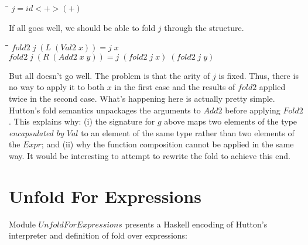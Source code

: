 \documentclass[10pt]{article}
\newlength{\lwidth}\setlength{\lwidth}{4.5cm}
\newlength{\cwidth}\setlength{\cwidth}{8mm} %
\newcommand{\Conid}[1]{\mathit{#1}}
\newcommand{\Varid}[1]{\mathit{#1}}
\begin{document}
\begin{tabbing}
\qquad\=\hspace{\lwidth}\=\hspace{\cwidth}\=\+\kill
${\Varid{j}\mathrel{=}\Varid{id}\mathbin{<+>}(\mathbin{+})}$
\end{tabbing}
If all goes well, we should be able to fold \ensuremath{\Varid{j}} through the structure.

\begin{tabbing}
\qquad\=\hspace{\lwidth}\=\hspace{\cwidth}\=\+\kill
${\Varid{fold2}\;\Varid{j}\;(\Conid{L}\;(\Conid{Val2}\;\Varid{x}))\mathrel{=}\Varid{j}\;\Varid{x}}$\\
${\Varid{fold2}\;\Varid{j}\;(\Conid{R}\;(\Conid{Add2}\;\Varid{x}\;\Varid{y}))\mathrel{=}\Varid{j}\;(\Varid{fold2}\;\Varid{j}\;\Varid{x})\;(\Varid{fold2}\;\Varid{j}\;\Varid{y})}$
\end{tabbing}
But all doesn't go well.  The problem is that the arity of \ensuremath{\Varid{j}} is
fixed.  Thus, there is no way to apply it to both \ensuremath{\Varid{x}} in the first
case and the results of \ensuremath{\Varid{fold2}} applied twice in the second case.
What's happening here is actually pretty simple.  Hutton's fold
semantics unpackages the arguments to \ensuremath{\Conid{Add2}} before applying \ensuremath{\Conid{Fold2}}.
This explains why: (i) the signature for \ensuremath{\Varid{g}} above maps two elements
of the type \emph{encapsulated by} \ensuremath{\Conid{Val}} to an element of the same
type rather than two elements of the \ensuremath{\Conid{Expr}}; and (ii) why the function
composition cannot be applied in the same way.  It would be
interesting to attempt to rewrite the fold to achieve this end.
\section{Unfold For Expressions}

Module \ensuremath{\Conid{UnfoldForExpressions}} presents a Haskell encoding of
Hutton's interpreter and definition of fold over expressions:
\end{document}
